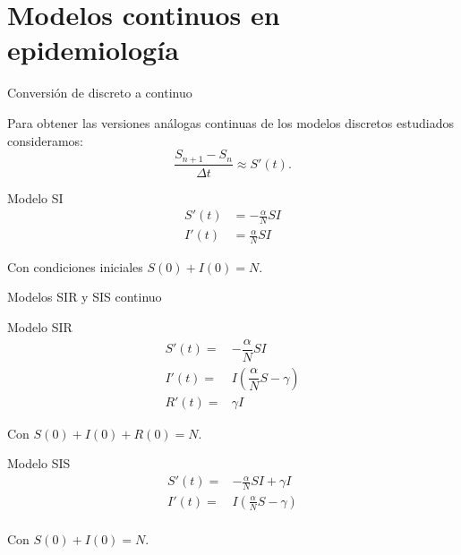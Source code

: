 

\section{Modelos continuos en epidemiología}


\begin{frame}{Conversión de discreto a continuo}

    Para obtener las versiones análogas continuas de los modelos discretos estudiados consideramos:    
    $$\frac{S_{n+1} - S_n}{\Delta t} \approx S'(t).$$
    
    \pause
    \begin{block}{Modelo SI}
        \begin{equation}
            \label{eqn:SI_continuo}
            \begin{aligned}
            S'(t) & = -\frac{\alpha}{N}SI \\
            I'(t) & = \frac{\alpha}{N}SI
            \end{aligned}
        \end{equation}
            
        Con condiciones iniciales $S(0)+I(0)=N$.
    \end{block}
\end{frame}


\begin{frame}{Modelos SIR y SIS continuo}

    \begin{block}{Modelo SIR}
        \begin{equation}
            \label{eqn: modelo_SIR_continuo}
            \begin{aligned}
            S'(t) = & -\dfrac{\alpha}{N}SI \\
            I'(t) = & I\left(\dfrac{\alpha}{N}S-\gamma \right) \\
            R'(t) = & \gamma I
            \end{aligned}
            \end{equation}
            
            Con $S(0)+I(0)+R(0)=N$.
    \end{block}

    \pause

    \begin{block}{Modelo SIS}
        \begin{equation}
            \label{eqn: modelo_SIS_continuo}
            \begin{aligned}
            S'(t) = & -\frac{\alpha}{N}SI+\gamma I \\
            I'(t) = & I\left( \frac{\alpha}{N}S-\gamma \right) \\
            \end{aligned}
            \end{equation}
        
            Con $S(0)+I(0)=N$. 
        \end{block}
\end{frame}


